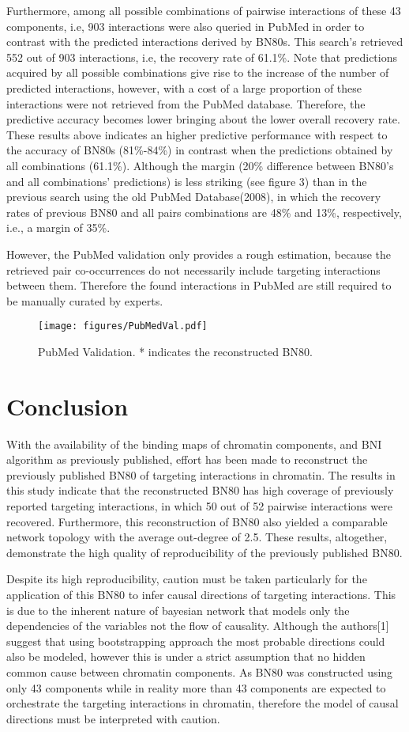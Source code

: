 \documentclass{bioinfo}
\begin{document}
Furthermore, among all possible combinations of pairwise interactions of these 43 components, i.e, 903 interactions were also queried in PubMed in order to contrast with the predicted interactions derived by BN80s.  This search's retrieved 552 out of 903 interactions, i.e, the recovery rate of 61.1\%. Note that predictions acquired by all possible combinations give rise to the increase of the number of predicted interactions, however, with a cost of a large proportion of these interactions were not retrieved from the PubMed database. Therefore, the predictive accuracy becomes lower bringing about the lower overall recovery rate. These results above indicates an higher predictive performance with respect to the accuracy of BN80s (81\%-84\%) in contrast when the predictions obtained by all combinations (61.1\%). Although the margin (20\% difference between BN80's and all combinations' predictions) is less striking (see figure 3) than in the previous search using the old PubMed Database(2008), in which the recovery rates of previous BN80 and all pairs combinations are 48\% and 13\%, respectively, i.e., a margin of 35\%.

However, the PubMed validation only provides a rough estimation, because the retrieved pair co-occurrences do not necessarily include targeting interactions between them. Therefore the found interactions in PubMed are still required to be manually curated by experts.
\begin{figure}[!tpb]%
\centerline{\texttt{[image: figures/PubMedVal.pdf]}}
\caption{PubMed Validation. * indicates the reconstructed BN80.}\label{fig:03}
\end{figure}

\section{Conclusion}
With the availability of the binding maps of chromatin components, and BNI algorithm as previously published, effort has been made to reconstruct the previously published BN80 of targeting interactions in chromatin. The results in this study indicate that the reconstructed BN80 has high coverage of previously reported targeting interactions, in which 50 out of 52 pairwise interactions were recovered. Furthermore, this reconstruction of BN80 also yielded a comparable network topology with the average out-degree of 2.5. These results, altogether, demonstrate the high quality of reproducibility of the previously published BN80. 

Despite its high reproducibility, caution must be taken particularly for the application of this BN80 to infer causal directions of targeting interactions. This is due to the inherent nature of bayesian network that models only the dependencies of the variables not the flow of causality. Although the authors[1] suggest that using bootstrapping approach the most probable directions could also be modeled, however this is under a strict assumption that no hidden common cause between chromatin components. As BN80 was constructed using only 43 components while in reality more than 43 components are expected to orchestrate the targeting interactions in chromatin, therefore the model of causal directions must be interpreted with caution.
\end{document}
